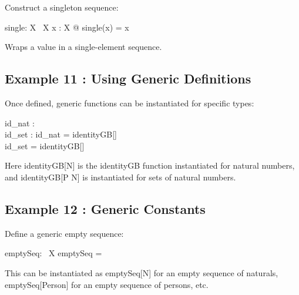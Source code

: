 \documentclass[a4paper,10pt,fleqn]{article}
\begin{document}
\noindent Construct a singleton sequence:

\bigskip

\begin{gendef}[X]
  single: X \fun \seq~X
\where
  \forall x : X @ single(x) = \langle x \rangle
\end{gendef}

\noindent Wraps a value in a single-element sequence.

\bigskip

\subsection*{Example 11 : Using Generic Definitions}

\noindent Once defined, generic functions can be instantiated for specific types:

\bigskip

\begin{axdef}
id\_nat : \nat \fun \nat \\
id\_set : \power \nat \fun \power \nat
\where
id\_nat = identityGB[\nat] \\
id\_set = identityGB[\power \nat]
\end{axdef}

\noindent Here identityGB[N] is the identityGB function instantiated for natural numbers, and identityGB[P N] is instantiated for sets of natural numbers.

\bigskip

\subsection*{Example 12 : Generic Constants}

\noindent Define a generic empty sequence:

\bigskip

\begin{gendef}[X]
  emptySeq: \seq~X
\where
  emptySeq = \langle \rangle
\end{gendef}

\noindent This can be instantiated as emptySeq[N] for an empty sequence of naturals, emptySeq[Person] for an empty sequence of persons, etc.

\bigskip
\end{document}
